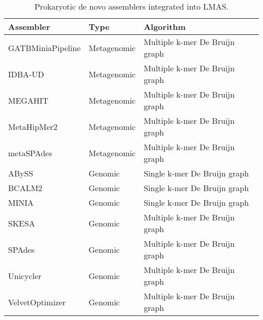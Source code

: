 \begin{scriptsize}
\begin{center}

\begin{table}[]
\centering
\caption{Prokaryotic de novo assemblers integrated into LMAS.}
\label{tab:ch5_table1}
\begin{tabular}{@{}lll@{}}
\toprule
Assembler         & Type        & Algorithm                        \\ \midrule
GATBMiniaPipeline & Metagenomic & Multiple   k-mer De Bruijn graph \\
IDBA-UD           & Metagenomic & Multiple   k-mer De Bruijn graph \\
MEGAHIT           & Metagenomic & Multiple   k-mer De Bruijn graph \\
MetaHipMer2       & Metagenomic & Multiple   k-mer De Bruijn graph \\
metaSPAdes        & Metagenomic & Multiple   k-mer De Bruijn graph \\
ABySS             & Genomic     & Single   k-mer De Bruijn graph   \\
BCALM2            & Genomic     & Single   k-mer De Bruijn graph   \\
MINIA             & Genomic     & Single   k-mer De Bruijn graph   \\
SKESA             & Genomic     & Multiple   k-mer De Bruijn graph \\
SPAdes            & Genomic     & Multiple   k-mer De Bruijn graph \\
Unicycler         & Genomic     & Multiple   k-mer De Bruijn graph \\
VelvetOptimizer   & Genomic     & Multiple   k-mer De Bruijn graph \\ \bottomrule
\end{tabular}
\end{table}

\end{center}
\end{scriptsize}
